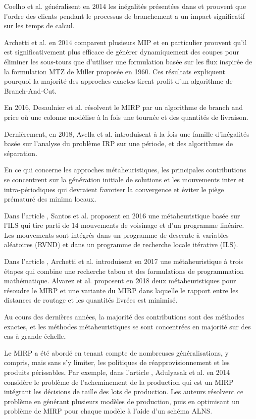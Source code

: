 Coelho et al. généralisent en 2014 les inégalités présentées dans \cite{IRP_Archetti} et prouvent que l'ordre des clients pendant le processus de branchement a un impact significatif sur les temps de calcul.

Archetti et al. en 2014 comparent plusieurs MIP et en particulier prouvent qu'il est significativement plus efficace de générer dynamiquement des coupes pour éliminer les sous-tours que d'utiliser une formulation basée sur les flux inspirée de la formulation MTZ de Miller proposée en 1960. Ces résultats expliquent pourquoi la majorité des approches exactes tirent profit d'un algorithme de Branch-And-Cut.

En 2016, Desaulnier et al. \cite{IRP_Guy} résolvent le MIRP par un algorithme de branch and price où une colonne modélise à la fois une tournée et des quantités de livraison. 

Dernièrement, en 2018, Avella et al. \cite{IRP_Alvarez} introduisent à la fois une famille d'inégalités basée sur l'analyse du problème IRP sur une période, et des algorithmes de séparation. 

En ce qui concerne les approches métaheuristiques, les principales contributions se concentrent sur la génération initiale de solutions et les mouvements inter et intra-périodiques qui devraient favoriser la convergence et éviter le piège prématuré des minima locaux.

Dans l'article \cite{IRP_Edcarllos}, Santos et al. proposent en 2016 une métaheuristique basée sur l'ILS qui tire parti de 14 mouvements de voisinage et d'un programme linéaire. Les mouvements sont intégrés dans un programme de descente à variables aléatoires (RVND) et dans un programme de recherche locale itérative (ILS).

Dans l'article \cite{IRP_Archetti_2017}, Archetti et al. introduisent en 2017 une métaheuristique à trois étapes qui combine une recherche tabou et des formulations de programmation mathématique. Alvarez et al. proposent en 2018 deux métaheuristiques pour résoudre le MIRP et une variante du MIRP dans laquelle le rapport entre les distances de routage et les quantités livrées est minimisé.

Au cours des dernières années, la majorité des contributions sont des méthodes exactes, et les méthodes métaheuristiques se sont concentrées en majorité sur des cas à grande échelle.

Le MIRP a été abordé en tenant compte de nombreuses généralisations, y compris, mais sans s'y limiter, les politiques de réapprovisionnement et les produits périssables. Par exemple, dans l'article \cite{IRP_Adulyasak}, Adulyasak et al. en 2014 considère le problème de l'acheminement de la production  qui est un MIRP intégrant les décisions de taille des lots de production. Les auteurs résolvent ce problème en générant plusieurs modèles de production, puis en optimisant un problème de MIRP pour chaque modèle à l'aide d'un schéma ALNS. 

